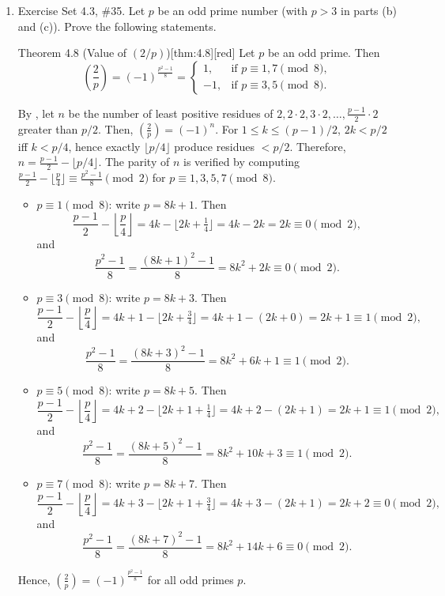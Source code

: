\begin{enumerate}
  \newpage
  \item Exercise Set 4.3, \#35.
  Let $p$ be an odd prime number (with $p>3$ in parts (b) and (c)). 
  Prove the following statements.
  \begin{define}{Theorem 4.8 (Value of $(2/p)$)}[thm:4.8][red]
  Let $p$ be an odd prime. Then
  \[
  \left(\frac{2}{p}\right)=(-1)^{\frac{p^2-1}{8}}=
  \begin{cases}
  1, & \text{if } p\equiv 1,7\pmod 8,\\[4pt]
  -1,& \text{if } p\equiv 3,5\pmod 8.
  \end{cases}
  \]
  \begin{subprove}
  By , let $n$ be the number of least positive residues of $2,2\cdot2,3\cdot2,\dots,\frac{p-1}{2}\cdot2$ greater than $p/2$. Then, $\left(\frac{2}{p}\right)=(-1)^n$.
  For $1\le k\le (p-1)/2$, $2k<p/2$ iff $k<p/4$, hence exactly $\lfloor p/4\rfloor$ produce residues $<p/2$. Therefore, $n = \frac{p-1}{2} - \lfloor p/4\rfloor$.
  The parity of $n$ is verified by computing $\frac{p-1}{2}-\lfloor\frac{p}{4}\rfloor \equiv \frac{p^2-1}{8}\pmod 2$ for $p\equiv 1,3,5,7\pmod 8$.
  \begin{itemize}
  \item $p\equiv 1\pmod 8$: write $p=8k+1$. Then
  \[
  \frac{p-1}{2}-\left\lfloor\frac{p}{4}\right\rfloor = 4k - \lfloor 2k+\tfrac14\rfloor =4k-2k=2k\equiv 0\pmod2,
  \]
  and
  \[
  \frac{p^2-1}{8}=\frac{(8k+1)^2-1}{8}=8k^2+2k\equiv 0\pmod2.
  \]
  \item $p\equiv 3\pmod 8$: write $p=8k+3$. Then
  \[
  \frac{p-1}{2}-\left\lfloor\frac{p}{4}\right\rfloor =4k+1 - \lfloor 2k+\tfrac34\rfloor =4k+1-(2k+0)=2k+1\equiv 1\pmod2,
  \]
  and
  \[
  \frac{p^2-1}{8}=\frac{(8k+3)^2-1}{8}=8k^2+6k+1\equiv 1\pmod2.
  \]
  \item $p\equiv 5\pmod 8$: write $p=8k+5$. Then
  \[
  \frac{p-1}{2}-\left\lfloor\frac{p}{4}\right\rfloor =4k+2 - \lfloor 2k+1+\tfrac14\rfloor =4k+2-(2k+1)=2k+1\equiv 1\pmod2,
  \]
  and
  \[
  \frac{p^2-1}{8}=\frac{(8k+5)^2-1}{8}=8k^2+10k+3\equiv 1\pmod2.
  \]
  \item $p\equiv 7\pmod 8$: write $p=8k+7$. Then
  \[
  \frac{p-1}{2}-\left\lfloor\frac{p}{4}\right\rfloor =4k+3 - \lfloor 2k+1+\tfrac34\rfloor =4k+3-(2k+1)=2k+2\equiv 0\pmod2,
  \]
  and
  \[
  \frac{p^2-1}{8}=\frac{(8k+7)^2-1}{8}=8k^2+14k+6\equiv 0\pmod2.
  \]
  \end{itemize}
  Hence, $\left(\frac{2}{p}\right)=(-1)^{\frac{p^2-1}{8}}$ for all odd primes $p$.
  \end{subprove}

\end{define}
\end{enumerate}
